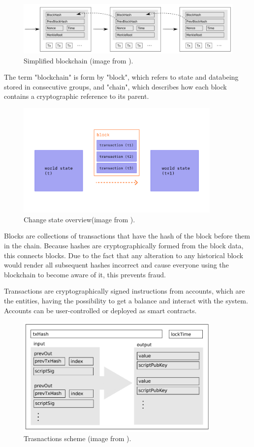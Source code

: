 \begin{figure}
    \centering
    \includegraphics[width=15cm]{logos/SimplifiedBlockChain.png}
    \caption{Simplified blockchain (image from \cite{BlockChain1}).}
    \label{fig:simpleBlockChain}
\end{figure}



The term "blockchain" is form by "block", which refers to state and databeing stored in consecutive groups, and "chain", 
which describes how each block contains a cryptographic reference to its parent. 
\begin{figure}
    \centering
    \includegraphics[width=10cm]{logos/tx-block.png}
    \caption{Change state overview(image from \cite{EthDocs}).}
    \label{fig:changeState}
\end{figure}

Blocks are collections of transactions that have the hash of the block before them in the chain.
Because hashes are cryptographically formed from the block data, this connects blocks.
Due to the fact that any alteration to any historical block would render all subsequent hashes incorrect and cause everyone using the blockchain to become aware of it, this prevents fraud. 

Transactions are cryptographically signed instructions from accounts, which are the entities, having the possibility to get a balance and interact with the system. 
Accounts can be user-controlled or deployed as smart contracts.

\begin{figure}
    \centering
    \includegraphics[width=10cm]{logos/Transactions.png}
    \caption{Trasnactions scheme (image from \cite{BlockChain1}).}
    \label{fig:transactionsBlockChain}
\end{figure}

